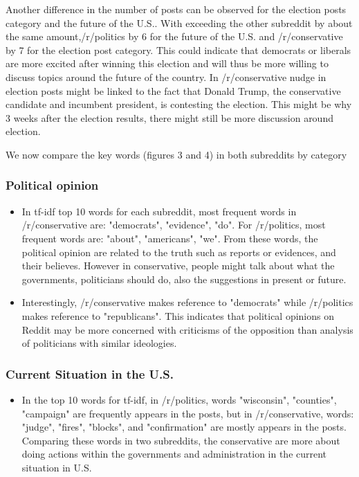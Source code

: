 \documentclass[11pt]{article}
\begin{document}
\par
Another difference in the number of posts can be observed for the election posts category and the future of the U.S.. With exceeding the other subreddit by about the same amount,/r/politics by 6 for the future of the U.S. and /r/conservative by 7 for the election post category. This could indicate that democrats or liberals are more excited after winning this election and will thus be more willing to discuss topics around the future of the country. In /r/conservative nudge in election posts might be linked to the fact that Donald Trump, the conservative candidate and incumbent president, is contesting the election. This might be why 3 weeks after the election results, there might still be more discussion around election.
\par
We now compare the key words (figures 3 and 4) in both subreddits by category
\subsubsection*{Political opinion}


\begin{itemize}
    \item In tf-idf top 10 words for each subreddit, most frequent words in /r/conservative are: "democrats", "evidence", "do". For /r/politics, most frequent words are: "about", "americans", "we". From these words, the political opinion are related to the truth such as reports or evidences, and their believes. However in conservative, people might talk about what the governments, politicians should do, also the suggestions in present or future.
    \item Interestingly, /r/conservative makes reference to "democrats" while /r/politics makes reference to "republicans". This indicates that political opinions on Reddit may be more concerned with criticisms of the opposition than analysis of politicians with similar ideologies.
\end{itemize}
\subsubsection*{Current Situation in the U.S.}
\begin{itemize}
    \item In the top 10 words for tf-idf, in /r/politics, words "wisconsin", "counties", "campaign" are frequently appears in the posts, but in /r/conservative, words: "judge", "fires", "blocks", and "confirmation" are mostly appears in the posts. Comparing these words in two subreddits, the conservative are more about doing actions within the governments and administration in the current situation in U.S.
\end{itemize}
\end{document}
